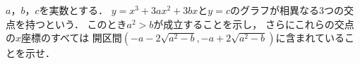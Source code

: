 \documentclass[../../main.tex]{subfiles}
\begin{document}
$a$，$b$，$c$を実数とする．
$y=x^3+3ax^2+3bx$と$y=c$のグラフが相異なる3つの交点を持つという．
このとき$a^2>b$が成立することを示し，
さらにこれらの交点の$x$座標のすべては
開区間$(-a-2\sqrt{a^2-b},-a+2\sqrt{a^2-b})$に含まれていることを示せ．
\end{document}
